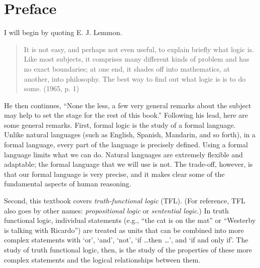 \chapter{Preface}

I will begin by quoting E. J. Lemmon.
\begin{quote}
It is not easy, and perhaps not even useful, to explain briefly what logic is. Like most subjects, it comprises many different kinds of problem and has no exact boundaries; at one end, it shades off into mathematics, at another, into philosophy. The best way to find out what logic is is to do some. (1965, p. 1)
\end{quote}
He then continues, ``None the less, a few very general remarks about the subject may help to set the stage for the rest of this book.'' Following his lead, here are some general remarks. First, formal logic is the study of a formal language. Unlike natural languages (such as English, Spanish, Mandarin, and so forth), in a formal language, every part of the language is precisely defined. Using a formal language limits what we can do. Natural languages are extremely flexible and adaptable; the formal language that we will use is not. The trade-off, however, is that our formal language is very precise, and it makes clear some of the fundamental aspects of human reasoning.

Second, this textbook covers \textit{truth-functional logic} (TFL). (For reference, TFL also goes by other names: \textit{propositional logic} or \textit{sentential logic}.) In truth functional logic, individual statements (e.g., ``the cat is on the mat'' or ``Westerby is talking with Ricardo'') are treated as units that can be combined into more complex statements with  ‘or’, ‘and’, ‘not’, ‘if \ldots then \ldots’, and `if and only if'. The study of truth functional logic, then, is the study of the properties of these more complex statements and the logical relationships between them. 



